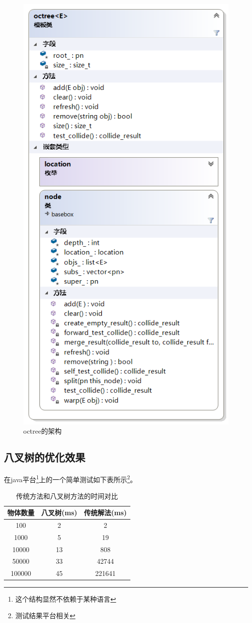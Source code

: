 \begin{figure} 
    \centering 
    \includegraphics[width=.65\textwidth]{ClassDiagram4.png}
\caption{octree的架构} %
\label{cd4} %
\end{figure}

\subsection{八叉树的优化效果}
在java平台\footnote{这个结构显然不依赖于某种语言}上的一个简单测试如下表所示\footnote{测试结果平台相关}。

\begin{table}[!htbp]
    \centering
    \caption{传统方法和八叉树方法的时间对比}
    \begin{tabular}{ccc}
        \hline
        物体数量& 八叉树(ms)& 传统解法(ms)\\
        \hline
        100 & 2 & 2\\
        1000 & 5 & 19\\
        10000 & 13 & 808\\
        50000 & 33 & 42744\\
        100000 & 45 & 221641\\
        \hline
    \end{tabular}
\end{table}

